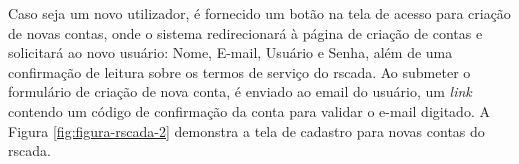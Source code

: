 Caso seja um novo utilizador, é fornecido um botão na tela de acesso para criação de novas contas, onde o sistema redirecionará à página de criação de contas e solicitará ao novo usuário: Nome, E-mail, Usuário e Senha, além de uma confirmação de leitura sobre os termos de serviço do rscada. Ao submeter o formulário de criação de nova conta, é enviado ao email do usuário, um \textit{link} contendo um código de confirmação da conta para validar o e-mail digitado. A Figura \ref{fig:figura-rscada-2} demonstra a tela de cadastro para novas contas do rscada.

        \begin{figure}[!h]
    	\end{figure}

